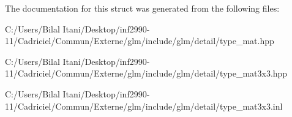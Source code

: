The documentation for this struct was generated from the following files\+:\begin{DoxyCompactItemize}
\item 
C\+:/\+Users/\+Bilal Itani/\+Desktop/inf2990-\/11/\+Cadriciel/\+Commun/\+Externe/glm/include/glm/detail/type\+\_\+mat.\+hpp\item 
C\+:/\+Users/\+Bilal Itani/\+Desktop/inf2990-\/11/\+Cadriciel/\+Commun/\+Externe/glm/include/glm/detail/type\+\_\+mat3x3.\+hpp\item 
C\+:/\+Users/\+Bilal Itani/\+Desktop/inf2990-\/11/\+Cadriciel/\+Commun/\+Externe/glm/include/glm/detail/type\+\_\+mat3x3.\+inl\end{DoxyCompactItemize}
